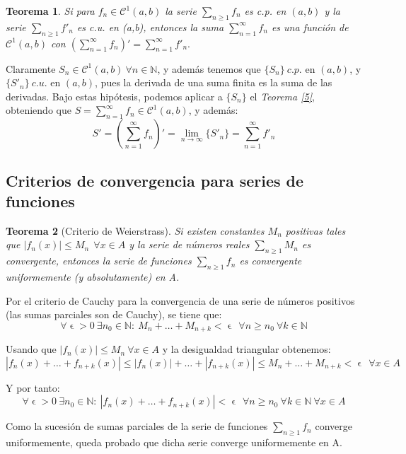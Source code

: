 \documentclass[11pt, a4paper]{article}
\makeatletter
\newif\IfInSansMode
\let\oldsf\sffamily
\renewcommand*{\sffamily}{\oldsf\mathversion{sans}\InSansModetrue}
\let\oldnorm\normalfont
\renewcommand*{\normalfont}{\oldnorm\InSansModefalse\mathversion{normal}}
\let\epsilon\upvarepsilon
\renewenvironment{proof}[1][\proofname] {\par\pushQED{\qed}\normalfont\topsep6\p@\@plus6\p@\relax\trivlist\item[\hskip\labelsep\itshape\sffamily#1\@addpunct{.}]\ignorespaces}{\popQED\endtrivlist\@endpefalse}
\theoremstyle{theorem-style}
\newtheorem{nth}{Teorema}[section]
\theoremstyle{definition-style}
\theoremstyle{remark-style}
\theoremstyle{example-style}
\makeatother
\begin{document}
\begin{nth} \label{9}
  Si para $f_n\in \mathcal{C}^1(a,b)$  la serie  $\sum_{n\geq 1} f_n $ es  c.p.  en $(a,b)$ y  la serie  $ \sum_{n\geq 1} f'_n $ es  c.u. en (a,b), entonces la suma $\displaystyle \sum_{n=1}^{\infty} f_n $ es una funci\'on de  $\mathcal{C}^1(a,b)$ con 
  $
  \displaystyle \left( \sum_{n=1}^{\infty} f_n \right)' =  \sum_{n=1}^{\infty}  f'_n  .
  $
\end{nth}


  \begin{proof}
    Claramente $S_n \in \mathcal{C}^1(a,b)\ \forall n \in \mathbb{N}$, y además tenemos que $\{S_n\}\ c.p.$ en $(a,b)$, y $\{S'_n\}\ c.u.$ en $(a,b)$, pues la derivada de una suma finita es la suma de las derivadas. Bajo estas hipótesis, podemos aplicar a $\{S_n\}$ el \textit{Teorema \ref{5}}, obteniendo que $S = \sum_{n=1}^{\infty} f_n \in \mathcal{C}^1(a,b)$, y además:
    $$S' = \left( \sum_{n=1}^{\infty} f_n \right)' = \lim_{n \to \infty} \{S'_n\} = \sum_{n=1}^{\infty} f'_n$$
  \end{proof}

\subsection{Criterios de convergencia para series de funciones}

\begin{nth}[Criterio de Weierstrass] \label{10}
  Si existen constantes $ M_{n} $ positivas tales que $ |f_{n}(x)| \leq M_{n}\ \ \forall x \in A$ y la serie de números reales $ \sum_{n \ge 1}M_{n} $ es convergente, entonces la serie de funciones $ \sum_{n \ge 1}f_{n} $ es convergente uniformemente (y absolutamente) en A.  
\end{nth}

\begin{proof}
    Por el criterio de Cauchy para la convergencia de una serie de números positivos (las sumas parciales son de Cauchy), se tiene que:
    $$ \forall \epsilon > 0\ \exists n_{0} \in \mathbb{N}:\ M_{n} + \dots + M_{n+k} < \epsilon\ \  \forall n \geq n_{0}\ \forall k \in \mathbb{N} $$
    
    Usando que $ |f_{n}(x)| \leq M_{n}\ \forall x \in A $ y la desigualdad triangular obtenemos:
    $$ |f_{n}(x) + \dots + f_{n+k}(x)| \leq |f_{n}(x)| + \dots + |f_{n+k}(x)| \leq M_{n} + \dots + M_{n+k} < \epsilon\ \ \forall x \in A $$
    
    Y por tanto:
    $$\forall \epsilon > 0\ \exists n_{0} \in \mathbb{N}:\ |f_{n}(x) + \dots + f_{n+k}(x)| < \epsilon\ \  \forall n \geq n_{0}\ \forall k \in \mathbb{N}\ \forall x \in A $$
    
    Como la sucesión de sumas parciales de la serie de funciones $\sum_{n\ge 1} f_n$ converge uniformemente, queda probado que dicha serie converge uniformemente en A.
  \end{proof}
\end{document}
